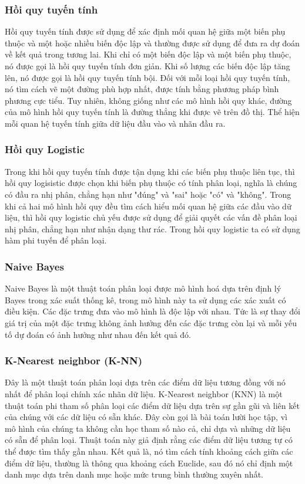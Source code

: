 \subsubsection{Hồi quy tuyến tính}
Hồi quy tuyến tính được sử dụng để xác định mối quan hệ giữa một biến phụ thuộc và một hoặc nhiều biến độc lập và thường được sử dụng để đưa ra dự đoán về kết quả trong tương lai. Khi chỉ có một biến độc lập và một biến phụ thuộc, nó được gọi là hồi quy tuyến tính đơn giản. Khi số lượng các biến độc lập tăng lên, nó được gọi là hồi quy tuyến tính bội. Đối với mỗi loại hồi quy tuyến tính, nó tìm cách vẽ một đường phù hợp nhất, được tính bằng phương pháp bình phương cực tiểu. Tuy nhiên, không giống như các mô hình hồi quy khác, đường của mô hình hồi quy tuyến tính là đường thẳng khi được vẽ trên đồ thị. Thể hiện mỗi quan hệ tuyến tính giữa dữ liệu đầu vào và nhãn đầu ra.
\subsubsection{Hồi quy Logistic}
Trong khi hồi quy tuyến tính được tận dụng khi các biến phụ thuộc liên tục, thì hồi quy logisistic được chọn khi biến phụ thuộc có tính phân loại, nghĩa là chúng có đầu ra nhị phân, chẳng hạn như "đúng" và "sai" hoặc "có" và "không". Trong khi cả hai mô hình hồi quy đều tìm cách hiểu mối quan hệ giữa các đầu vào dữ liệu, thì hồi quy logistic chủ yếu được sử dụng để giải quyết các vấn đề phân loại nhị phân, chẳng hạn như nhận dạng thư rác. Trong hồi quy logistic ta có sử dụng hàm phi tuyến để phân loại.
\subsubsection{Naive Bayes}
Naive Bayes là một thuật toán phân loại được mô hình hoá dựa trên định lý Bayes trong xác suất thống kê, trong mô hình này ta sử dụng các xác xuất có điều kiện. Các đặc trưng đưa vào mô hình là độc lập với nhau. Tức là sự thay đổi giá trị của một đặc trưng không ảnh hưởng đến các đặc trưng còn lại và mỗi yếu tố dự đoán có ảnh hưởng như nhau đến kết quả đó.
\subsubsection{K-Nearest neighbor (K-NN)}
Đây là một thuật toán phân loại dựa trên các điểm dữ liệu tương đồng với nó nhất để phân loại chính xác nhãn dữ liệu. K-Nearest neighbor (KNN) là một thuật toán phi tham số phân loại các điểm dữ liệu dựa trên sự gần gũi và liên kết của chúng với các dữ liệu có sẵn khác. Đây còn gọi là bài toán lười học tập, vì mô hình của chúng ta không cần học tham số nào cả, chỉ dựa và những dữ liệu có sẵn để phân loại. Thuật toán này giả định rằng các điểm dữ liệu tương tự có thể được tìm thấy gần nhau. Kết quả là, nó tìm cách tính khoảng cách giữa các điểm dữ liệu, thường là thông qua khoảng cách Euclide, sau đó nó chỉ định một danh mục dựa trên danh mục hoặc mức trung bình thường xuyên nhất.
